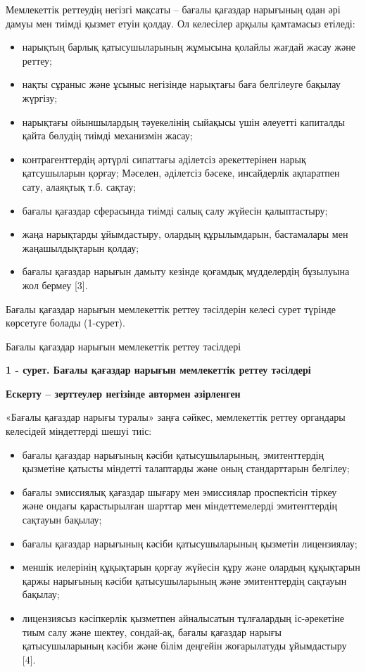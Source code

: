 Мемлекеттік реттеудің негізгі мақсаты -- бағалы қағаздар нарығының одан
әрі дамуы мен тиімді қызмет етуін қолдау. Ол келесілер арқылы қамтамасыз
етіледі:

\begin{itemize}
\item
  нарықтың барлық қатысушыларының жұмысына қолайлы жағдай жасау және
  реттеу;
\item
  нақты сұраныс және ұсыныс негізінде нарықтағы баға белгілеуге бақылау
  жүргізу;
\item
  нарықтағы ойыншылардың тәуекелінің сыйақысы үшін әлеуетті капиталды
  қайта бөлудің тиімді механизмін жасау;
\item
  контрагенттердің әртүрлі сипаттағы әділетсіз әрекеттерінен нарық
  қатсушыларын қорғау; Мәселен, әділетсіз бәсеке, инсайдерлік ақпаратпен
  сату, алаяқтық т.б. сақтау;
\item
  бағалы қағаздар сферасында тиімді салық салу жүйесін қалыптастыру;
\item
  жаңа нарықтарды ұйымдастыру, олардың құрылымдарын, бастамалары мен
  жаңашылдықтарын қолдау;
\item
  бағалы қағаздар нарығын дамыту кезінде қоғамдық мүдделердің бұзылуына
  жол бермеу {[}3{]}.
\end{itemize}

Бағалы қағаздар нарығын мемлекеттік реттеу тәсілдерін келесі сурет
түрінде көрсетуге болады (1-сурет).

Бағалы қағаздар нарығын мемлекеттік реттеу тәсілдері

{\bfseries 1 - сурет. Бағалы қағаздар нарығын мемлекеттік реттеу тәсілдері}

{\bfseries Ескерту -- зерттеулер негізінде автормен әзірленген}

«Бағалы қағаздар нарығы туралы» заңға сәйкес, мемлекеттік реттеу
органдары келесідей міндеттерді шешуі тиіс:

\begin{itemize}
\item
  бағалы қағаздар нарығының кәсіби қатысушыларының, эмитенттердің
  қызметіне қатысты міндетті талаптарды және оның стандарттарын
  белгілеу;
\item
  бағалы эмиссиялық қағаздар шығару мен эмиссиялар проспектісін тіркеу
  және ондағы қарастырылған шарттар мен міндеттемелерді эмитенттердің
  сақтауын бақылау;
\item
  бағалы қағаздар нарығының кәсіби қатысушыларының қызметін лицензиялау;
\item
  меншік иелерінің құқықтарын қорғау жүйесін құру және олардың
  құқықтарын қаржы нарығының кәсіби қатысушыларының және эмитенттердің
  сақтауын бақылау;
\item
  лицензиясыз кәсіпкерлік қызметпен айналысатын тұлғалардың іс-әрекетіне
  тиым салу және шектеу, сондай-ақ, бағалы қағаздар нарығы
  қатысушыларының кәсіби және білім деңгейін жоғарылатуды ұйымдастыру
  {[}4{]}.
\end{itemize}

